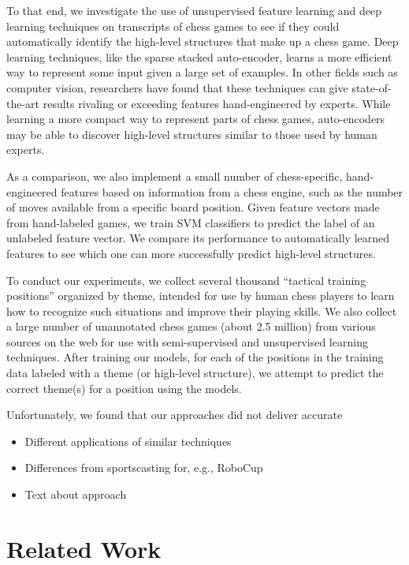 \documentclass[11pt]{article}
\begin{document}
To that end, we investigate the use of unsupervised feature learning and deep learning techniques on transcripts of chess games to see if they could automatically identify the high-level structures that make up a chess game. Deep learning techniques, like the sparse stacked auto-encoder, learns a more efficient way to represent some input given a large set of examples. In other fields such as computer vision, researchers have found that these techniques can give state-of-the-art results rivaling or exceeding features hand-engineered by experts. While learning a more compact way to represent parts of chess games, auto-encoders may be able to discover high-level structures similar to those used by human experts.

As a comparison, we also implement a small number of chess-specific, hand-engineered features based on information from a chess engine, such as the number of moves available from a specific board position. Given feature vectors made from hand-labeled games, we train SVM classifiers to predict the label of an unlabeled feature vector. We compare its performance to automatically learned features to see which one can more successfully predict high-level structures.

To conduct our experiments, we collect several thousand ``tactical training positions'' organized by theme, intended for use by human chess players to learn how to recognize such situations and improve their playing skills. We also collect a large number of unannotated chess games (about 2.5 million) from various sources on the web for use with semi-supervised and unsupervised learning techniques. After training our models, for each of the positions in the training data labeled with a theme (or high-level structure), we attempt to predict the correct theme(s) for a position using the models.

Unfortunately, we found that our approaches did not deliver accurate 

\begin{itemize}


\item Different applications of similar techniques
\item Differences from sportscasting for, e.g., RoboCup
\item Text about approach
\end{itemize}

\section{Related Work}
\end{document}
